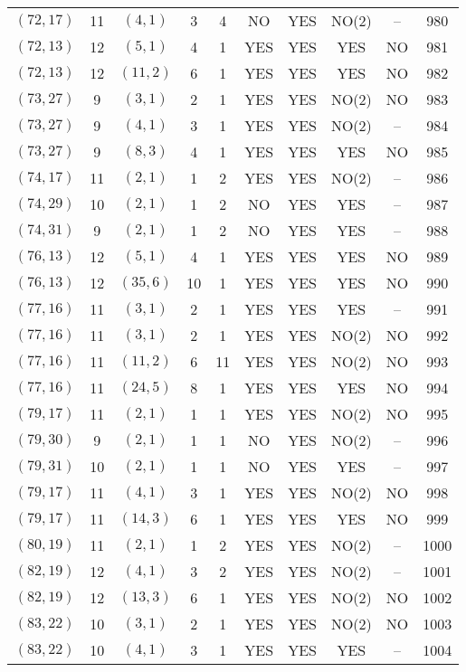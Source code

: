 \begin{longtable}{|c|c|c|c|c|c|c|c|c|c|}
$(72, 17)$ & 11 & $(4, 1)$ & 3 & 4 & NO & YES & NO(2) & -- & 980\\
$(72, 13)$ & 12 & $(5, 1)$ & 4 & 1 & YES & YES & YES & NO & 981\\
$(72, 13)$ & 12 & $(11, 2)$ & 6 & 1 & YES & YES & YES & NO & 982\\
$(73, 27)$ & 9 & $(3, 1)$ & 2 & 1 & YES & YES & NO(2) & NO & 983\\
$(73, 27)$ & 9 & $(4, 1)$ & 3 & 1 & YES & YES & NO(2) & -- & 984\\
$(73, 27)$ & 9 & $(8, 3)$ & 4 & 1 & YES & YES & YES & NO & 985\\
$(74, 17)$ & 11 & $(2, 1)$ & 1 & 2 & YES & YES & NO(2) & -- & 986\\
$(74, 29)$ & 10 & $(2, 1)$ & 1 & 2 & NO & YES & YES & -- & 987\\
$(74, 31)$ & 9 & $(2, 1)$ & 1 & 2 & NO & YES & YES & -- & 988\\
$(76, 13)$ & 12 & $(5, 1)$ & 4 & 1 & YES & YES & YES & NO & 989\\
$(76, 13)$ & 12 & $(35, 6)$ & 10 & 1 & YES & YES & YES & NO & 990\\
$(77, 16)$ & 11 & $(3, 1)$ & 2 & 1 & YES & YES & YES & -- & 991\\
$(77, 16)$ & 11 & $(3, 1)$ & 2 & 1 & YES & YES & NO(2) & NO & 992\\
$(77, 16)$ & 11 & $(11, 2)$ & 6 & 11 & YES & YES & NO(2) & NO & 993\\
$(77, 16)$ & 11 & $(24, 5)$ & 8 & 1 & YES & YES & YES & NO & 994\\
$(79, 17)$ & 11 & $(2, 1)$ & 1 & 1 & YES & YES & NO(2) & NO & 995\\
$(79, 30)$ & 9 & $(2, 1)$ & 1 & 1 & NO & YES & NO(2) & -- & 996\\
$(79, 31)$ & 10 & $(2, 1)$ & 1 & 1 & NO & YES & YES & -- & 997\\
$(79, 17)$ & 11 & $(4, 1)$ & 3 & 1 & YES & YES & NO(2) & NO & 998\\
$(79, 17)$ & 11 & $(14, 3)$ & 6 & 1 & YES & YES & YES & NO & 999\\
$(80, 19)$ & 11 & $(2, 1)$ & 1 & 2 & YES & YES & NO(2) & -- & 1000\\
$(82, 19)$ & 12 & $(4, 1)$ & 3 & 2 & YES & YES & NO(2) & -- & 1001\\
$(82, 19)$ & 12 & $(13, 3)$ & 6 & 1 & YES & YES & NO(2) & NO & 1002\\
$(83, 22)$ & 10 & $(3, 1)$ & 2 & 1 & YES & YES & NO(2) & NO & 1003\\
$(83, 22)$ & 10 & $(4, 1)$ & 3 & 1 & YES & YES & YES & -- & 1004\\

\end{longtable}
